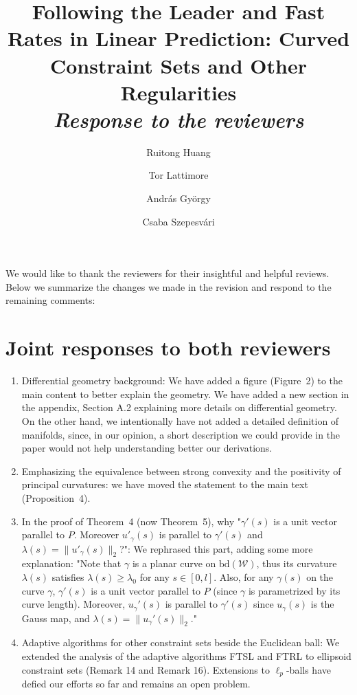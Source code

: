 \documentclass[10pt,english]{article}
\title{Following the Leader and
Fast Rates in Linear Prediction:
Curved Constraint Sets and Other Regularities \\
\emph{Response to the reviewers}}
\author{Ruitong Huang \and Tor Lattimore \and Andr\'as Gy\"orgy \and Csaba Szepesv\'ari}
\newcommand{\cW}{\mathcal{W}}
\newcommand{\bd}{\mathrm{bd}}
\begin{document}
\maketitle
We would like to thank the reviewers for their insightful and helpful reviews. Below we summarize the changes we made in the revision and respond to the remaining comments:

\section*{Joint responses to both reviewers}
\begin{enumerate}
\item Differential geometry background: We have added a figure (Figure~2) to the main content to better explain the geometry. We have added a new section in the appendix, Section A.2 explaining more details on differential geometry. On the other hand, we intentionally have not added a detailed definition of manifolds, since, in our opinion, a short description we could provide in the paper would not help understanding better our derivations.
\item Emphasizing the equivalence between strong convexity and the positivity of principal curvatures: we have moved the statement to the main text (Proposition~4).
\item In the proof of Theorem~4 (now Theorem~5), why "$\gamma'(s)$ is a unit vector parallel to $P$. Moreover $u'_{\gamma}(s)$ is parallel to $\gamma'(s)$ and $\lambda(s) = \| u'_{\gamma}(s) \|_2$?": We rephrased this part, adding some more explanation:
"Note that $\gamma$ is a planar curve on $\bd(\cW)$, 
thus its curvature $\lambda(s)$ satisfies $\lambda(s) \ge \lambda_0$ for any $s\in [0,l]$.
Also, for any $\gamma(s)$ on the curve $\gamma$, $\gamma'(s)$ is a unit vector parallel to $P$ (since $\gamma$ is parametrized by its curve length). 
Moreover, $u_\gamma'(s)$ is parallel to $\gamma'(s)$ since $u_{\gamma}(s)$ is the Gauss map, and $\lambda(s) = \|u_\gamma'(s)\|_2$."
\item Adaptive algorithms for other constraint sets beside the Euclidean ball: We extended the analysis of the adaptive algorithms FTSL and FTRL to ellipsoid constraint sets (Remark 14 and Remark 16). Extensions to $\ell_p$-balls have defied our efforts so far and remains an open problem.
\end{enumerate}
\end{document}
